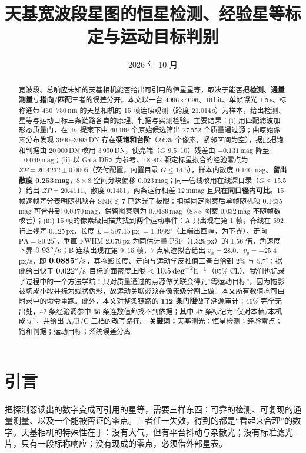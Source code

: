 \documentclass[11pt,a4paper]{ctexart}
\title{\bfseries 天基宽波段星图的恒星检测、经验星等标定与运动目标判别}
\author{}
\date{2026 年 10 月}
\begin{document}
\maketitle
\begin{abstract}
\noindent
宽波段、总响应未知的天基相机能否给出可引用的恒星星等，取决于能否把\textbf{检测}、\textbf{通量测量}与\textbf{指向/匹配}三者的误差分开。本文以一台 4096$\times$4096、16\,bit、单帧曝光 1.5\,s、标称通带 450--750\,nm 的天基相机的 15 帧连续观测（跨度 21.014\,s）为样本，给出检测、星等与运动目标三条链路各自的原理、判据与实测检验。主要结果：(i) 用匹配滤波加形态质量门，在 4$\sigma$ 提案下由 66\,469 个原始候选筛出 27\,552 个质量通过源；由原始像素分布发现 3990--3993\,DN 存在\textbf{硬饱和台阶}（2\,639 个像素，紧邻区间为空），据此把饱和判据由 20\,000\,DN 改用 3\,990\,DN，使亮端（$G$ 9.5--10）残差由 $-0.131$\,mag 降至 $-0.049$\,mag；(ii) 以 Gaia DR3 为参考、18\,902 颗定标星拟合的经验零点为 $ZP=20.4232\pm0.0005$（交付配置，内置目录 $G\le14.5$），样本内散度 0.140\,mag、\textbf{留出散度 0.253\,mag}，$8\times8$ 空间分块偏移 0.023\,mag；同一管线改用在线深目录（$G\le15.5$）给出 $ZP=20.4111$、散度 0.1451，两条运行相差 12\,mmag 且\textbf{只在同口径内可比}。15 帧逐帧差分表明随机项在 $\mathrm{SNR}\lesssim7$ 已达光子极限：扣掉固定图案后单帧随机项 0.1435\,mag 可合并到 0.0370\,mag，保留图案则为 0.0489\,mag（8$\times$8 图案 0.032\,mag 不随帧数改善）；(iii) 15 帧的像素级扫描共找到\textbf{两个}运动事件：A 只出现在第 1 帧，脊线在 592 行上残差 0.125\,px，长度 $L=597.15$\,px $=1.3992^\circ$（上端出画幅，为下界），走向 $\mathrm{PA}=80.25^\circ$，垂直 FWHM 2.079\,px 为同估计量 PSF（1.329\,px）的 1.56 倍，角速度下界 $0.93^\circ/{\rm s}$；B 连续出现在第 9--15 帧，7 点轨迹拟合给出 $v_x=28.0$、$v_y=-25.4$\,px/s，即 $\mathbf{0.0885^\circ/{\rm s}}$，其拖影长度、走向与运动学反推值三者自洽到 2\% 与 $5.7^\circ$；据此给出快于 $0.022^\circ/{\rm s}$ 目标的面密度上限 $<10.5\,{\rm deg}^{-2}{\rm h}^{-1}$（95\% CL）。我们也记录了过程中的一个方法学坑：只对质量通过的点源做关联会得到“零运动目标”，因为拖影被切成小段并标为线状伪影，故运动关联必须在像素级分割上做。本文所有数值均可由附录中的命令重跑。此外，本文对整条链路的 \textbf{112 条门限}做了溯源审计：46\% 完全无出处，42 条经验调参中 36 条连数值都找不到依据；其中 47 条标记为“仅对本帧/本机成立”，并给出 A/B/C 三档的改写路径。
\vspace{0.6em}
\noindent\textbf{关键词：}天基测光；恒星检测；经验零点；饱和判据；运动目标；系统误差分离
\end{abstract}

\section{引言}
把探测器读出的数字变成可引用的星等，需要三样东西：可靠的检测、可复现的通量测量、以及一个能被否证的零点。三者任一失效，得到的都是“看起来合理”的数字。天基相机的特殊性在于：没有大气，但有平台抖动与杂散光；没有标准滤光片，只有一段标称响应；没有现成的零点，必须借外部星表。
\end{document}
